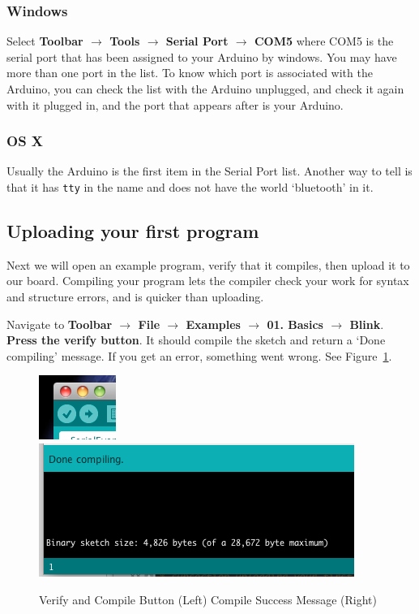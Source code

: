 \documentclass[11pt,a4paper]{article}
\begin{document}
\subsubsection{Windows} %

\label{ssub:windows}
Select \textbf{Toolbar $\rightarrow$ Tools $\rightarrow$ Serial Port $\rightarrow$ COM5} where COM5 is the serial port that has been assigned to your Arduino by windows.  You may have more than one port in the list.  To know which port is associated with the Arduino, you can check the list with the Arduino unplugged, and check it again with it plugged in, and the port that appears after is your Arduino.


\subsubsection{OS X} %
\label{ssub:os_x}
Usually the Arduino is the first item in the Serial Port list.  Another way to tell is that it has \texttt{tty} in the name and does not have the world `bluetooth' in it.



\subsection{Uploading your first program} %
\label{sub:uploading_your_first_program}
Next we will open an example program, verify that it compiles, then upload it to our board.  Compiling your program lets the compiler check your work for syntax and structure errors, and is quicker than uploading.

Navigate to \textbf{Toolbar $\rightarrow$ File $\rightarrow$ Examples $\rightarrow$ 01. Basics $\rightarrow$ Blink}.  \textbf{Press the verify button}.  It should compile the sketch and return a `Done compiling' message.  If you get an error, something went wrong. See Figure~\ref{fig:figures_verify}. 

    \begin{figure}[htbp]
        \centering
            \includegraphics{figures/verify.png}\includegraphics{figures/compile.png}
        \caption{Verify and Compile Button (Left) Compile Success Message (Right)}
        \label{fig:figures_verify}
    \end{figure}
\end{document}
